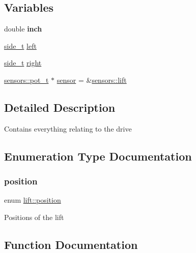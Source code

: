 \subsection*{Variables}
\begin{DoxyCompactItemize}
\item 
\mbox{\label{namespacelift_a3d44b39574f68db44182b8079f4fd5d0}} 
double {\bfseries inch}
\item 
\hyperlink{structlift_1_1side__t}{side\+\_\+t} \hyperlink{namespacelift_acbf81adbb531b3d3f6d5b1ef946c81f7}{left}
\item 
\hyperlink{structlift_1_1side__t}{side\+\_\+t} \hyperlink{namespacelift_a62e75ece6036a2e9ef8c6edf92d668a1}{right}
\item 
\hyperlink{structsensors_1_1pot__t}{sensors\+::pot\+\_\+t} $\ast$ \hyperlink{namespacelift_af71770a66903080ec69dfc131240e214}{sensor} = \&\hyperlink{namespacesensors_a846dce2ebdbd35cd6abdbd3173dfb289}{sensors\+::lift}
\end{DoxyCompactItemize}


\subsection{Detailed Description}
Contains everything relating to the drive 

\subsection{Enumeration Type Documentation}
\mbox{\label{namespacelift_a4a1c349e765b3b8489da50822876099d}} 
\subsubsection{\texorpdfstring{position}{position}}
{\footnotesize\ttfamily enum \hyperlink{namespacelift_a4a1c349e765b3b8489da50822876099d}{lift\+::position}}

Positions of the lift 

\subsection{Function Documentation}
\mbox{\label{namespacelift_af207a144f6c87583f4abbb9cb3f9838f}} 
